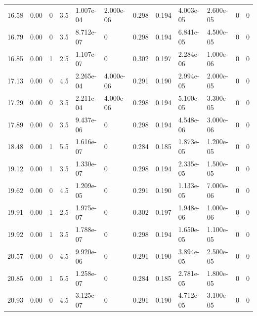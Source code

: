 \documentclass[preview]{standalone}
\begin{document}
{{\begin{tabular}{L{1.2cm}C{1.2cm} C{0.3cm}C{0.5cm} C{1.4cm}C{1.4cm} C{1.4cm}C{1.4cm} C{1.6cm}C{1.6cm} C{1.6cm}C{1.6cm}}
  16.58  &  0.00  & 0     & 3.5 &  1.007e-04  & 2.000e-06  &  0.298&   0.194& 4.003e-05 & 2.600e-05   &  0 & 0  \\ 
  16.79  &  0.00  & 0     & 3.5 &  8.712e-07  & 0  &  0.298&   0.194& 6.841e-05 & 4.500e-05   &  0 & 0  \\ 
  16.85  &  0.00  & 1     & 2.5 &  1.107e-07  & 0  &  0.302&   0.197& 2.284e-06 & 1.000e-06   &  0 & 0  \\ 
  17.13  &  0.00  & 0     & 4.5 &  2.265e-04  & 4.000e-06  &  0.291&   0.190& 2.994e-05 & 2.000e-05   &  0 & 0  \\ 
  17.29  &  0.00  & 0     & 3.5 &  2.211e-04  & 4.000e-06  &  0.298&   0.194& 5.100e-05 & 3.300e-05   &  0 & 0  \\ 
  17.89  &  0.00  & 0     & 3.5 &  9.437e-06  & 0  &  0.298&   0.194& 4.548e-06 & 3.000e-06   &  0 & 0  \\ 
  18.48  &  0.00  & 1     & 5.5 &  1.616e-07  & 0  &  0.284&   0.185& 1.873e-05 & 1.200e-05   &  0 & 0  \\ 
  19.12  &  0.00  & 1     & 3.5 &  1.330e-07  & 0  &  0.298&   0.194& 2.335e-05 & 1.500e-05   &  0 & 0  \\ 
  19.62  &  0.00  & 0     & 4.5 &  1.209e-05  & 0  &  0.291&   0.190& 1.133e-05 & 7.000e-06   &  0 & 0  \\ 
  19.91  &  0.00  & 1     & 2.5 &  1.975e-07  & 0  &  0.302&   0.197& 1.948e-06 & 1.000e-06   &  0 & 0  \\ 
  19.92  &  0.00  & 1     & 3.5 &  1.788e-07  & 0  &  0.298&   0.194& 1.650e-05 & 1.100e-05   &  0 & 0  \\ 
  20.57  &  0.00  & 0     & 4.5 &  9.920e-06  & 0  &  0.291&   0.190& 3.894e-05 & 2.500e-05   &  0 & 0  \\ 
  20.85  &  0.00  & 1     & 5.5 &  1.258e-07  & 0  &  0.284&   0.185& 2.781e-05 & 1.800e-05   &  0 & 0  \\ 
  20.93  &  0.00  & 0     & 4.5 &  3.125e-07  & 0  &  0.291&   0.190& 4.712e-05 & 3.100e-05   &  0 & 0  \\ 
\hline 
\end{tabular} 

}}
\end{document}
